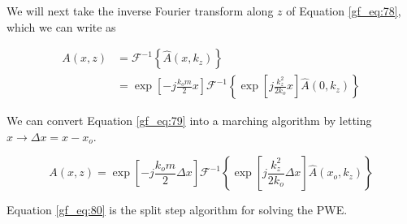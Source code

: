 We will next take the inverse Fourier transform along $z$ of Equation \ref{gf_eq:78}, which we can write as

\begin{equation}
\begin{aligned}
A(x,z) &= \mathcal{F}^{-1}\left\{\hat{A}(x,k_z) \right\} \\
&= \exp\left[-j\frac{k_om}{2}x\right]\mathcal{F}^{-1}\left\{\exp\left[j\frac{k_z^2}{2k_o}x \right]\hat{A}(0,k_z) \right\}
\end{aligned}
\label{gf_eq:79}
\end{equation}
\renewcommand{\baselinestretch}{2} \small\normalsize

\noindent We can convert Equation \ref{gf_eq:79} into a marching algorithm by letting $x\rightarrow \Delta x = x-x_o$.

\begin{equation}
\boxed{A(x,z) = \exp\left[-j\frac{k_om}{2}\Delta x\right]\mathcal{F}^{-1}\left\{\exp\left[j\frac{k_z^2}{2k_o}\Delta x \right]\hat{A}(x_o,k_z) \right\}}
\label{gf_eq:80}
\end{equation}
\renewcommand{\baselinestretch}{2} \small\normalsize

Equation \ref{gf_eq:80} is the split step algorithm for solving the PWE.